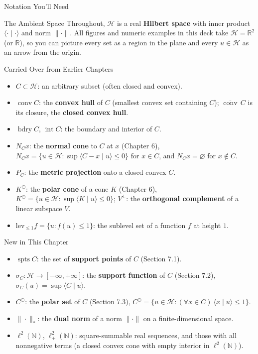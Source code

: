 \documentclass[aspectratio=169,10pt]{beamer}
\DeclareMathOperator{\conv}{conv}
\DeclareMathOperator{\spts}{spts}
\DeclareMathOperator{\bdry}{bdry}
\DeclareMathOperator{\Int}{int}
\newcommand{\R}{\mathbb{R}}
\newcommand{\N}{\mathbb{N}}
\newcommand{\Hil}{\mathcal{H}}
\newcommand{\ip}[2]{\langle #1 \mid #2 \rangle}
\newcommand{\closure}[1]{\overline{#1}}
\begin{document}
\begin{frame}[allowframebreaks]{Notation You'll Need}

  \begin{block}{The Ambient Space}
    Throughout, $\Hil$ is a real \textbf{Hilbert space} with inner product
    $\ip{\cdot}{\cdot}$ and norm $\|\cdot\|$. All figures and numeric examples
    in this deck take $\Hil = \R^2$ (or $\R$), so you can picture every set as
    a region in the plane and every $u \in \Hil$ as an arrow from the origin.
  \end{block}

  \begin{block}{Carried Over from Earlier Chapters}
    \begin{itemize}
      \item $C \subset \Hil$: an arbitrary subset (often closed and convex).
      \item $\conv C$: the \textbf{convex hull} of $C$ (smallest convex set
        containing $C$); $\closure{\conv}\,C$ is its closure, the
        \textbf{closed convex hull}.
      \item $\bdry C$, $\Int C$: the boundary and interior of $C$.
      \item $N_C x$: the \textbf{normal cone} to $C$ at $x$ (Chapter 6),
        $N_Cx = \{u \in \Hil : \sup\ip{C-x}{u} \le 0\}$ for $x \in C$, and
        $N_Cx = \varnothing$ for $x \notin C$.
      \item $P_C$: the \textbf{metric projection} onto a closed convex $C$.
      \item $K^\ominus$: the \textbf{polar cone} of a cone $K$ (Chapter 6),
        $K^\ominus = \{u \in \Hil : \sup\ip{K}{u}\le 0\}$; $V^\perp$: the
        \textbf{orthogonal complement} of a linear subspace $V$.
      \item $\mathrm{lev}_{\le 1} f = \{u : f(u) \le 1\}$: the sublevel set of
        a function $f$ at height $1$.
    \end{itemize}
  \end{block}

  \framebreak

  \begin{block}{New in This Chapter}
    \begin{itemize}
      \item $\spts C$: the set of \textbf{support points} of $C$ (Section 7.1).
      \item $\sigma_C : \Hil \to [-\infty,+\infty]$: the \textbf{support
        function} of $C$ (Section 7.2), $\sigma_C(u) = \sup\ip{C}{u}$.
      \item $C^\odot$: the \textbf{polar set} of $C$ (Section 7.3),
        $C^\odot = \{u \in \Hil : (\forall x \in C)\ \ip{x}{u} \le 1\}$.
      \item $\|\cdot\|_*$: the \textbf{dual norm} of a norm $\|\cdot\|$ on a
        finite-dimensional space.
      \item $\ell^2(\N)$, $\ell^2_+(\N)$: square-summable real sequences, and
        those with all nonnegative terms (a closed convex cone with empty
        interior in $\ell^2(\N)$).
    \end{itemize}
  \end{block}


\end{frame}
\end{document}
